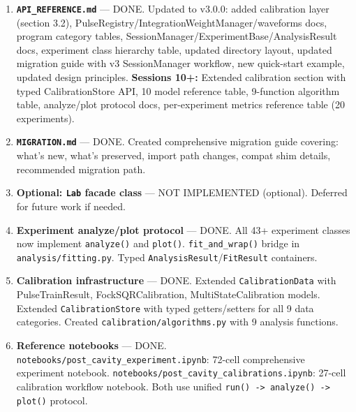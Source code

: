 \documentclass[11pt]{article}
\begin{document}
\begin{enumerate}[label=\textbf{R\arabic*}]
  \item \label{R7} \textbf{\texttt{API\_REFERENCE.md}}
        --- \textcolor{green!60!black}{DONE}.
        Updated to v3.0.0: added calibration layer (section 3.2),
        PulseRegistry/IntegrationWeightManager/waveforms docs,
        program category tables, SessionManager/ExperimentBase/AnalysisResult docs,
        experiment class hierarchy table, updated directory layout,
        updated migration guide with v3 SessionManager workflow,
        new quick-start example, updated design principles.
        \textbf{Sessions 10+:} Extended calibration section with typed CalibrationStore API,
        10 model reference table, 9-function algorithm table, analyze/plot protocol docs,
        per-experiment metrics reference table (20 experiments).

  \item \label{R8} \textbf{\texttt{MIGRATION.md}}
        --- \textcolor{green!60!black}{DONE}.
        Created comprehensive migration guide covering:
        what's new, what's preserved, import path changes,
        compat shim details, recommended migration path.

  \item \label{R9} \textbf{Optional: \texttt{Lab} facade class}
        --- NOT IMPLEMENTED (optional). Deferred for future work if needed.

  \item \label{R10} \textbf{Experiment analyze/plot protocol}
        --- \textcolor{green!60!black}{DONE}.
        All 43+ experiment classes now implement \texttt{analyze()} and \texttt{plot()}.
        \texttt{fit\_and\_wrap()} bridge in \texttt{analysis/fitting.py}.
        Typed \texttt{AnalysisResult}/\texttt{FitResult} containers.

  \item \label{R11} \textbf{Calibration infrastructure}
        --- \textcolor{green!60!black}{DONE}.
        Extended \texttt{CalibrationData} with PulseTrainResult, FockSQRCalibration,
        MultiStateCalibration models. Extended \texttt{CalibrationStore} with typed
        getters/setters for all 9 data categories. Created \texttt{calibration/algorithms.py}
        with 9 analysis functions.

  \item \label{R12} \textbf{Reference notebooks}
        --- \textcolor{green!60!black}{DONE}.
        \texttt{notebooks/post\_cavity\_experiment.ipynb}: 72-cell comprehensive experiment notebook.
        \texttt{notebooks/post\_cavity\_calibrations.ipynb}: 27-cell calibration workflow notebook.
        Both use unified \texttt{run() -> analyze() -> plot()} protocol.
\end{enumerate}
\end{document}
